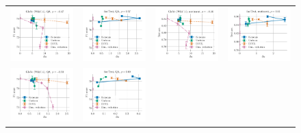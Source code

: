 \begin{figure}
\begin{tabular}{@{\hskip -0.0in}c@{\hskip -0.0in}c@{\hskip -0.0in}c@{\hskip -0.0in}c@{\hskip -0.0in}}
		\includegraphics[width=.245\linewidth]{figures/glove400k_qa_best-f1_vs_gram-large-dim-delta2-3_linx_stoc.pdf} &
		\includegraphics[width=.245\linewidth]{figures/fasttext1m_qa_best-f1_vs_gram-large-dim-delta2-3_linx_stoc.pdf} &
		\includegraphics[width=.245\linewidth]{figures/glove400k_sentiment_sst_test-acc_vs_gram-large-dim-delta2-3_linx_stoc.pdf} &
		\includegraphics[width=.245\linewidth]{figures/fasttext1m_sentiment_sst_test-acc_vs_gram-large-dim-delta2-3_linx_stoc.pdf} \\[-1em]
		\includegraphics[width=.245\linewidth]{figures/glove400k_qa_best-f1_vs_gram-large-dim-delta2-4_linx_stoc.pdf} &
		\includegraphics[width=.245\linewidth]{figures/fasttext1m_qa_best-f1_vs_gram-large-dim-delta2-4_linx_stoc.pdf} &

\end{tabular}
\end{figure}
